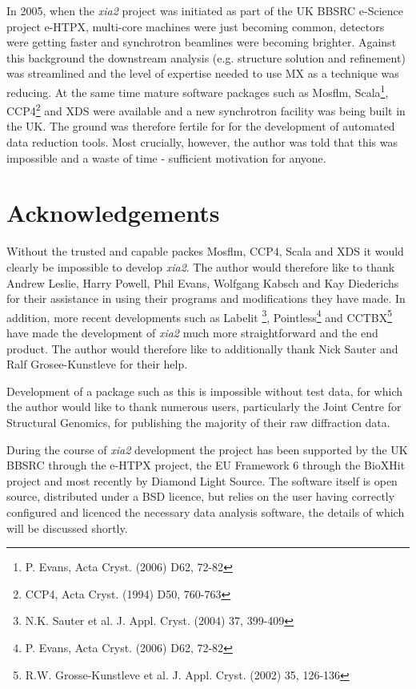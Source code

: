 \documentclass[a4paper, 11pt]{article}
\begin{document}
In 2005, when the \emph{xia2} project was initiated as part of the UK BBSRC
e-Science project e-HTPX, multi-core machines were just becoming common, 
detectors were getting faster and synchrotron beamlines were becoming 
brighter. Against this background the downstream analysis (e.g. structure 
solution and refinement) was streamlined and the level of expertise needed
to use MX as a technique was reducing. At the same time mature software
packages such as Mosflm, 
Scala\footnote{P. Evans, Acta Cryst. (2006) D62, 72-82}, 
CCP4\footnote{CCP4, Acta Cryst. (1994) D50, 760-763} 
and XDS were available and a new 
synchrotron facility was being built in the UK. The ground was therefore
fertile for for the development of automated data reduction tools. Most 
crucially, however, the author was told that this was impossible and a 
waste of time - sufficient motivation for anyone.

\section{Acknowledgements}

Without the trusted and capable packes Mosflm, CCP4, Scala and XDS it would 
clearly be impossible to develop \emph{xia2}. The author would therefore
like to thank Andrew Leslie, Harry Powell, Phil Evans, Wolfgang Kabsch 
and Kay Diederichs for their assistance in using their programs and 
modifications they have made. In addition, more recent developments
such as Labelit \footnote{N.K. Sauter et al. J. Appl. Cryst. (2004) 37, 
399-409}, Pointless\footnote{P. Evans, Acta Cryst. (2006) D62, 72-82}
and CCTBX\footnote{R.W. Grosse-Kunstleve et al. J. Appl. Cryst. (2002) 35, 
126-136} have made the development of \emph{xia2} much more straightforward
and the end product. The author would therefore like to additionally thank
Nick Sauter and Ralf Grosee-Kunstleve for their help.

Development of a package such as this is impossible without test data, for
which the author would like to thank numerous users, particularly the 
Joint Centre for Structural Genomics, for publishing the majority of their
raw diffraction data. 

During the course of \emph{xia2} development the project has been 
supported by the UK BBSRC through the e-HTPX project, the EU Framework 6
through the BioXHit project and most recently by Diamond Light Source.
The software itself is open source, distributed under a BSD licence, but 
relies on the user having correctly configured and licenced the necessary
data analysis software, the details of which will be discussed shortly.
\end{document}
